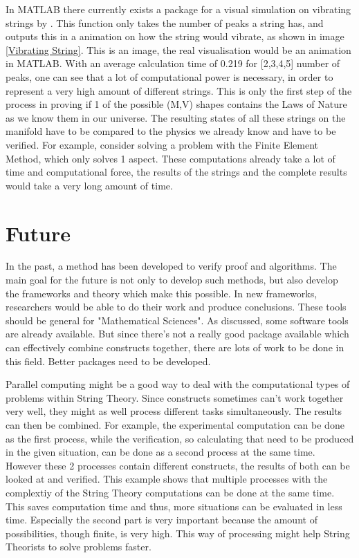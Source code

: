 \documentclass[../paper.tex]{subfiles}
\begin{document}
In MATLAB there currently exists a package for a visual simulation on vibrating strings by \citep{vibratingString}. This function only takes the number of peaks a string has, and outputs this in a animation on how the string would vibrate, as shown in image \ref{Vibrating String}. This is an image, the real visualisation would be an animation in MATLAB. With an average calculation time of 0.219 for [2,3,4,5] number of peaks, one can see that a lot of computational power is necessary, in order to represent a very high amount of different strings. This is only the first step of the process in proving if 1 of the possible (M,V) shapes contains the Laws of Nature as we know them in our universe. The resulting states of all these strings on the manifold have to be compared to the physics we already know and have to be verified. For example, consider solving a problem with the Finite Element Method, which only solves 1 aspect. These computations already take a lot of time and computational force, the results of the strings and the complete results would take a very long amount of time.

\section*{Future}
In the past, a method has been developed to verify proof and algorithms. The main goal for the future is not only to develop such methods, but also develop the frameworks and theory which make this possible. In new frameworks, researchers would be able to do their work and produce conclusions. These tools should be general for "Mathematical Sciences". As discussed, some software tools are already available. But since there's not a really good package available which can effectively combine constructs together, there are lots of work to be done in this field. Better packages need to be developed. 

Parallel computing might be a good way to deal with the computational types of problems within String Theory. Since constructs sometimes can't work together very well, they might as well process different tasks simultaneously. The results can then be combined. For example, the experimental computation can be done as the first process, while the verification, so calculating that need to be produced in the given situation, can be done as a second process at the same time. However these 2 processes contain different constructs, the results of both can be looked at and verified. This example shows that multiple processes with the complextiy of the String Theory computations can be done at the same time. This saves computation time and thus, more situations can be evaluated in less time. Especially the second part is very important because the amount of possibilities, though finite, is very high. This way of processing might help String Theorists to solve problems faster.
\end{document}
